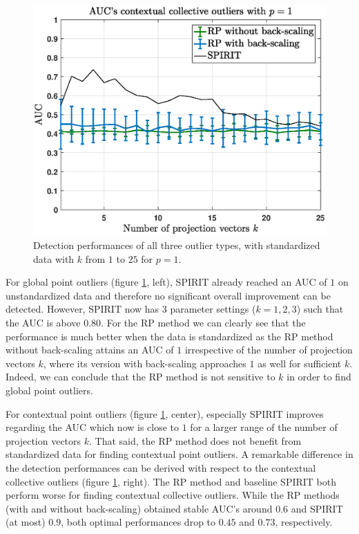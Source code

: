 \begin{figure}[h]
\begin{minipage}{0.333\textwidth}
	\end{minipage}
	\begin{minipage}{0.333\textwidth}
		\centering
		\includegraphics[scale=0.26]{analysis/AUCs_collective_standardized}
	\end{minipage}
	\caption{Detection performances of all three outlier types, with standardized data with $k$ from $1$ to $25$ for $p=1$.}
	\label{fig:app_aucs_standardized}
	\vspace{-0.2cm}
\end{figure}

For global point outliers (figure \ref{fig:app_aucs_standardized}, left), SPIRIT already reached an AUC of $1$ on unstandardized data and therefore no significant overall improvement can be detected. However, SPIRIT now has $3$ parameter settings ($k=1,2,3$) such that the AUC is above $0.80$. For the RP method we can clearly see that the performance is much better when the data is standardized as the RP method without back-scaling attains an AUC of $1$ irrespective of the number of projection vectors $k$, where its version with back-scaling approaches $1$ as well for sufficient $k$. Indeed, we can conclude that the RP method is not sensitive to $k$ in order to find global point outliers.

For contextual point outliers (figure \ref{fig:app_aucs_standardized}, center), especially SPIRIT improves regarding the AUC which now is close to $1$ for a larger range of the number of projection vectors $k$. That said, the RP method does not benefit from standardized data for finding contextual point outliers. A remarkable difference in the detection performances can be derived with respect to the contextual collective outliers (figure \ref{fig:app_aucs_standardized}, right). The RP method and baseline SPIRIT both perform worse for finding contextual collective outliers. While the RP methods (with and without back-scaling) obtained stable AUC's around $0.6$ and SPIRIT (at most) $0.9$, both optimal performances drop to $0.45$ and $0.73$, respectively.\\

